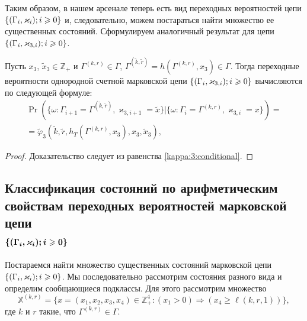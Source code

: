\documentclass[a4paper,12pt,russian]{extarticle}
\newcommand{\Mark}{\{(\Gamma_i, \varkappa_i); \hm{} i \geqslant 0\}}
\newcommand{\MarkThree}{\{(\Gamma_i, \varkappa_{3,i}); \hm{} i \geqslant 0\}}
\begin{document}
Таким образом, в нашем арсенале теперь есть вид переходных вероятностей цепи $\Mark$ и, следовательно, можем постараться найти множество ее существенных состояний. Сформулируем аналогичный результат для цепи $\MarkThree$.
\begin{theorem}
Пусть $x_3$, $\tilde{x}_3\in \mathbb{Z}_+$ и $\Gamma^{(k,r)}\in \Gamma$, $\Gamma^{(\tilde{k},\tilde{r})}=h(\Gamma^{(k,r)},x_3) \in \Gamma$. Тогда переходные вероятности однородной счетной марковской цепи $\MarkThree$ вычисляются по следующей формуле:
\begin{multline}
\Pr (\{\omega\colon\Gamma_{i+1}=\Gamma^{(\tilde{k},\tilde{r})},\varkappa_{3,i+1}=\tilde{x}\}|\{\omega\colon\Gamma_{i}=\Gamma^{(k,r)},\varkappa_{3,i}=x\}) 
= \\ =\widetilde{\varphi}_3(\tilde{k},\tilde{r},h_T(\Gamma^{(k,r)},x_3),x_3,\tilde{x}_3),
\label{transitionToProve:three}
\end{multline}
\end{theorem}
\begin{proof}
Доказательство следует из равенства \eqref{kappa:3:conditional}.
\end{proof}



\subsection[Классификация состояний по арифметическим свойствам переходных вероятностей марковской цепи $\boldsymbol{\Mark}$]%
{Классификация состояний по арифметическим \\ свойствам переходных вероятностей марковской цепи\\ $\boldsymbol{\Mark}$}
Постараемся найти множество существенных состояний марковской цепи $\Mark$. Мы последовательно рассмотрим состояния разного вида и определим сообщающиеся подклассы.   Для этого рассмотрим множество 
\begin{equation*}
{\mathbb X}^{(k,r)} = \{x = (x_1,x_2,x_3,x_4) \in \mathbb{Z}_+^4 \colon (x_1 > 0) \Rightarrow (x_4 \geqslant \ell(k,r,1))\},
\end{equation*}
где $k$ и $r$ такие, что $\Gamma^{(k,r)}\in \Gamma$. 
\end{document}

